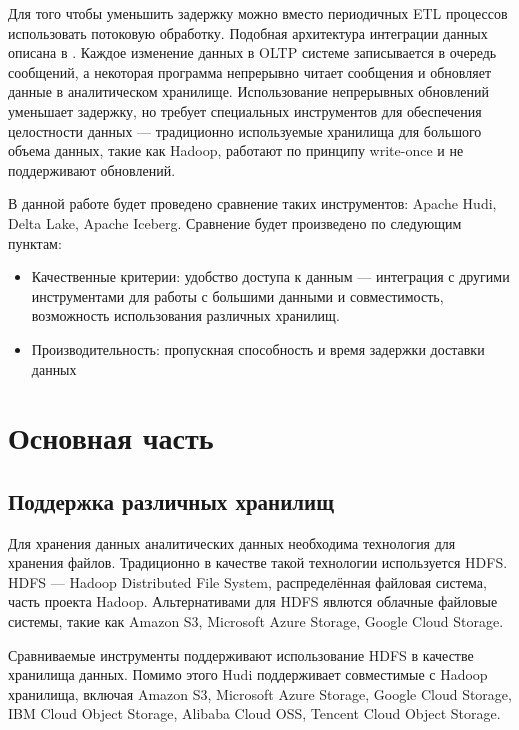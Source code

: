 \documentclass[%
bachelor,    %
subf,        %
href,        %
colorlinks,  %
]{disser}
\begin{document}
Для того чтобы уменьшить задержку можно вместо периодичных ETL процессов использовать потоковую обработку.
Подобная архитектура интеграции данных описана в \cite{streaming_integration}.
Каждое изменение данных в OLTP системе записывается в очередь сообщений, а некоторая программа непрерывно читает сообщения и обновляет данные в аналитическом хранилище.
Использование непрерывных обновлений уменьшает задержку, но требует специальных инструментов для обеспечения целостности данных --- традиционно используемые хранилища для большого объема данных, такие как Hadoop, работают по принципу write-once и не поддерживают обновлений. 

В данной работе будет проведено сравнение таких инструментов: Apache Hudi, Delta Lake, Apache Iceberg.
Сравнение будет произведено по следующим пунктам:
\begin{itemize}
	\item Качественные критерии: удобство доступа к данным --- интеграция с другими инструментами для работы с большими данными и совместимость, возможность использования различных хранилищ.

	\item Производительность: пропускная способность и время задержки доставки данных 

\end{itemize}
\section{Основная часть}
\subsection{Поддержка различных хранилищ}
Для хранения данных аналитических данных необходима технология для хранения файлов. Традиционно в качестве такой технологии используется HDFS. HDFS  --- Hadoop Distributed File System, распределённая файловая система, часть проекта Hadoop. Альтернативами для HDFS явлются облачные файловые системы, такие как Amazon S3, Microsoft Azure Storage, Google Cloud Storage.

Сравниваемые инструменты поддерживают использование HDFS в качестве хранилища данных. Помимо этого Hudi поддерживает совместимые с Hadoop хранилища, включая Amazon S3, Microsoft Azure Storage, Google Cloud Storage, IBM Cloud Object Storage, Alibaba Cloud OSS, Tencent Cloud Object Storage.
\end{document}
